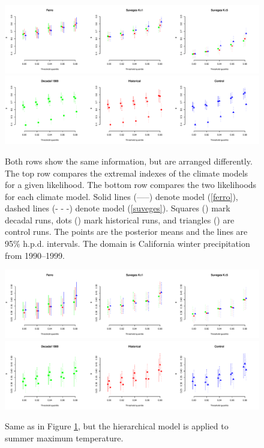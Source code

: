 \begin{figure}
\begin{center}
\includegraphics[scale=0.46]{figs/winter_like.pdf}
\includegraphics[scale=0.46]{figs/winter_source.pdf}
\end{center}
\caption{Both rows show the same information, but are arranged differently. The top row compares the extremal indexes of the climate models for a given likelihood. The bottom row compares the two likelihoods for each climate model. Solid lines (-----) denote model (\ref{ferro}), dashed lines (- - -) denote model (\ref{suveges}). Squares (\symsquare) mark decadal runs, dots (\symcircle) mark historical runs, and triangles (\symtriangle) are control runs. The points are the posterior means and the lines are 95\% h.p.d. intervals. The domain is California winter precipitation from 1990--1999.}
\label{figwinter}
\end{figure}

\begin{figure}
\begin{center}
\includegraphics[scale=0.46]{figs/summer_like.pdf}
\includegraphics[scale=0.46]{figs/summer_source.pdf}
\end{center}
\caption{Same as in Figure \ref{figwinter}, but the hierarchical model is applied to summer maximum temperature.}
\label{figsummer}
\end{figure}

